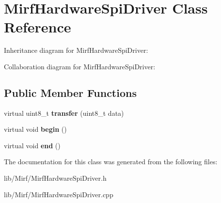 \hypertarget{class_mirf_hardware_spi_driver}{}\section{Mirf\+Hardware\+Spi\+Driver Class Reference}
\label{class_mirf_hardware_spi_driver}


Inheritance diagram for Mirf\+Hardware\+Spi\+Driver\+:


Collaboration diagram for Mirf\+Hardware\+Spi\+Driver\+:
\subsection*{Public Member Functions}
\begin{DoxyCompactItemize}
\item 
\mbox{\label{class_mirf_hardware_spi_driver_a923475f59f2aef07d84280f4a388f670}} 
virtual uint8\+\_\+t {\bfseries transfer} (uint8\+\_\+t data)
\item 
\mbox{\label{class_mirf_hardware_spi_driver_ac755022f208bf002610705b2b22d8fe8}} 
virtual void {\bfseries begin} ()
\item 
\mbox{\label{class_mirf_hardware_spi_driver_a4b6cecadf8833009137c8cd1a9f25b65}} 
virtual void {\bfseries end} ()
\end{DoxyCompactItemize}


The documentation for this class was generated from the following files\+:\begin{DoxyCompactItemize}
\item 
lib/\+Mirf/Mirf\+Hardware\+Spi\+Driver.\+h\item 
lib/\+Mirf/Mirf\+Hardware\+Spi\+Driver.\+cpp\end{DoxyCompactItemize}
